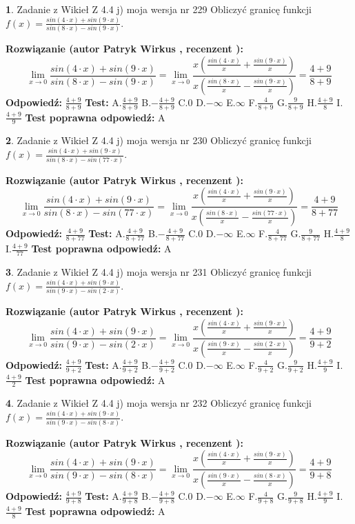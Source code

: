 \documentclass[12pt, a4paper]{article}
\theoremstyle{definition} %
\newtheorem{zad}{}
\newcommand{\zadStart}[1]{\begin{zad}#1\newline}
\newcommand{\zadStop}{\end{zad}}
\newcommand{\rozwStart}[2]{\noindent \textbf{Rozwiązanie (autor #1 , recenzent #2): }\newline}
\newcommand{\rozwStop}{\newline}
\newcommand{\odpStart}{\noindent \textbf{Odpowiedź:}\newline}
\newcommand{\odpStop}{\newline}
\newcommand{\testStart}{\noindent \textbf{Test:}\newline}
\newcommand{\testStop}{\newline}
\newcommand{\kluczStart}{\noindent \textbf{Test poprawna odpowiedź:}\newline}
\newcommand{\kluczStop}{\newline}
\begin{document}
\zadStart{Zadanie z Wikieł Z 4.4 j) moja wersja nr 229}
Obliczyć granicę funkcji $f(x)=\frac{sin(4\cdot x) +sin(9\cdot x)}{sin(8\cdot x) -sin(9\cdot x)}$.
\zadStop
\rozwStart{Patryk Wirkus}{}
$$\lim\limits_{x\to 0}\frac{sin(4\cdot x) +sin(9\cdot x)}{sin(8\cdot x) -sin(9\cdot x)}=\lim\limits_{x\to 0}\frac{x(\frac{sin(4\cdot x)}{x}+\frac{sin(9\cdot x)}{x})}{x(\frac{sin(8\cdot x)}{x}-\frac{sin(9\cdot x)}{x})}=\frac{4+9}{8+9}$$
\rozwStop
\odpStart
$\frac{4+9}{8+9}$
\odpStop
\testStart
A.$\frac{4+9}{8+9}$
B.$-\frac{4+9}{8+9}$
C.$0$
D.$-\infty$
E.$\infty$
F.$\frac{4}{8+9}$
G.$\frac{9}{8+9}$
H.$\frac{4+9}{8}$
I.$\frac{4+9}{9}$
\testStop
\kluczStart
A
\kluczStop



\zadStart{Zadanie z Wikieł Z 4.4 j) moja wersja nr 230}
Obliczyć granicę funkcji $f(x)=\frac{sin(4\cdot x) +sin(9\cdot x)}{sin(8\cdot x) -sin(77\cdot x)}$.
\zadStop
\rozwStart{Patryk Wirkus}{}
$$\lim\limits_{x\to 0}\frac{sin(4\cdot x) +sin(9\cdot x)}{sin(8\cdot x) -sin(77\cdot x)}=\lim\limits_{x\to 0}\frac{x(\frac{sin(4\cdot x)}{x}+\frac{sin(9\cdot x)}{x})}{x(\frac{sin(8\cdot x)}{x}-\frac{sin(77\cdot x)}{x})}=\frac{4+9}{8+77}$$
\rozwStop
\odpStart
$\frac{4+9}{8+77}$
\odpStop
\testStart
A.$\frac{4+9}{8+77}$
B.$-\frac{4+9}{8+77}$
C.$0$
D.$-\infty$
E.$\infty$
F.$\frac{4}{8+77}$
G.$\frac{9}{8+77}$
H.$\frac{4+9}{8}$
I.$\frac{4+9}{77}$
\testStop
\kluczStart
A
\kluczStop



\zadStart{Zadanie z Wikieł Z 4.4 j) moja wersja nr 231}
Obliczyć granicę funkcji $f(x)=\frac{sin(4\cdot x) +sin(9\cdot x)}{sin(9\cdot x) -sin(2\cdot x)}$.
\zadStop
\rozwStart{Patryk Wirkus}{}
$$\lim\limits_{x\to 0}\frac{sin(4\cdot x) +sin(9\cdot x)}{sin(9\cdot x) -sin(2\cdot x)}=\lim\limits_{x\to 0}\frac{x(\frac{sin(4\cdot x)}{x}+\frac{sin(9\cdot x)}{x})}{x(\frac{sin(9\cdot x)}{x}-\frac{sin(2\cdot x)}{x})}=\frac{4+9}{9+2}$$
\rozwStop
\odpStart
$\frac{4+9}{9+2}$
\odpStop
\testStart
A.$\frac{4+9}{9+2}$
B.$-\frac{4+9}{9+2}$
C.$0$
D.$-\infty$
E.$\infty$
F.$\frac{4}{9+2}$
G.$\frac{9}{9+2}$
H.$\frac{4+9}{9}$
I.$\frac{4+9}{2}$
\testStop
\kluczStart
A
\kluczStop



\zadStart{Zadanie z Wikieł Z 4.4 j) moja wersja nr 232}
Obliczyć granicę funkcji $f(x)=\frac{sin(4\cdot x) +sin(9\cdot x)}{sin(9\cdot x) -sin(8\cdot x)}$.
\zadStop
\rozwStart{Patryk Wirkus}{}
$$\lim\limits_{x\to 0}\frac{sin(4\cdot x) +sin(9\cdot x)}{sin(9\cdot x) -sin(8\cdot x)}=\lim\limits_{x\to 0}\frac{x(\frac{sin(4\cdot x)}{x}+\frac{sin(9\cdot x)}{x})}{x(\frac{sin(9\cdot x)}{x}-\frac{sin(8\cdot x)}{x})}=\frac{4+9}{9+8}$$
\rozwStop
\odpStart
$\frac{4+9}{9+8}$
\odpStop
\testStart
A.$\frac{4+9}{9+8}$
B.$-\frac{4+9}{9+8}$
C.$0$
D.$-\infty$
E.$\infty$
F.$\frac{4}{9+8}$
G.$\frac{9}{9+8}$
H.$\frac{4+9}{9}$
I.$\frac{4+9}{8}$
\testStop
\kluczStart
A
\kluczStop
\end{document}
